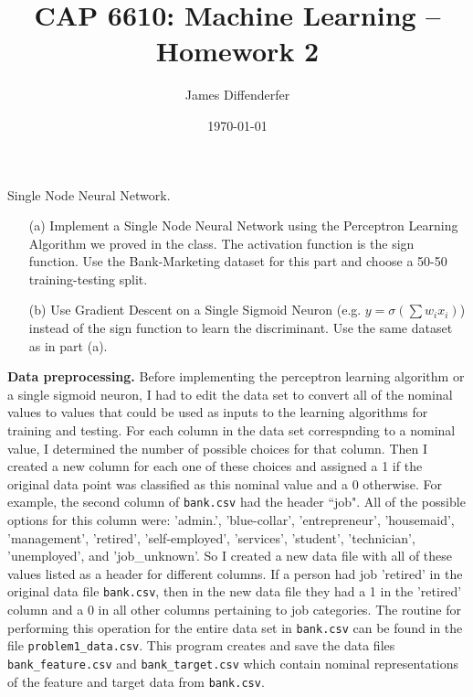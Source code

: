 \documentclass[8pt]{article}
\title{CAP 6610: Machine Learning -- Homework 2}
\author{James Diffenderfer}
\date{\today}
\theoremstyle{definition}
\newenvironment{exercise}[1]
  {\renewcommand\theinnerexercise{#1}\innerexercise}
  {\endinnerexercise}
\begin{document}
\maketitle


\justify
\begin{exercise}{1}
Single Node Neural Network.
\begin{enumerate}
    \item[(a)] Implement a Single Node Neural Network using the Perceptron Learning Algorithm we proved in the class. The activation function is the sign function. Use the Bank-Marketing dataset for this part and choose a 50-50 training-testing split.
    \item[(b)] Use Gradient Descent on a Single Sigmoid Neuron (e.g. $y = \sigma \left( \sum w_i x_i\right)$) instead of the sign function to learn the discriminant. Use the same dataset as in part (a).
\end{enumerate}
\end{exercise}

\noindent \textbf{Data preprocessing.} Before implementing the perceptron learning algorithm or a single sigmoid neuron, I had to edit the data set to convert all of the nominal values to values that could be used as inputs to the learning algorithms for training and testing. For each column in the data set correspnding to a nominal value, I determined the number of possible choices for that column. Then I created a new column for each one of these choices and assigned a 1 if the original data point was classified as this nominal value and a 0 otherwise. For example, the second column of \texttt{bank.csv} had the header ``job". All of the possible options for this column were: 'admin.', 'blue-collar', 'entrepreneur', 'housemaid', 'management', 'retired', 'self-employed', 'services', 'student', 'technician', 'unemployed', and 'job\_unknown'. So I created a new data file with all of these values listed as a header for different columns. If a person had job 'retired' in the original data file \texttt{bank.csv}, then in the new data file they had a 1 in the 'retired' column and a 0 in all other columns pertaining to job categories. The routine for performing this operation for the entire data set in \texttt{bank.csv} can be found in the file 
\texttt{problem1\_data.csv}. This program creates and save the data files \texttt{bank\_feature.csv} and \texttt{bank\_target.csv} which contain nominal representations of the feature and target data from \texttt{bank.csv}.\\
\end{document}
